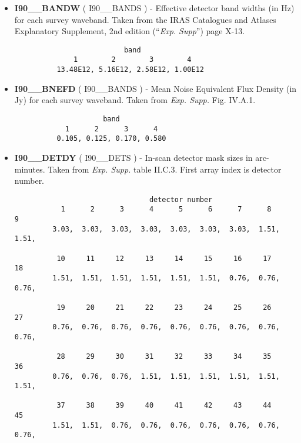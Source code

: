 \begin{itemize}
\item {\bf I90\_\_BANDW} ( I90\_\_BANDS ) -  Effective detector band widths (in Hz) for
each survey waveband. Taken from the IRAS Catalogues and Atlases Explanatory
Supplement, 2nd edition (``{\em Exp. Supp}'') page X-13.

\begin{minipage}[t]{\textwidth}
\small
\begin{verbatim}
                          band
              1        2        3        4
          13.48E12, 5.16E12, 2.58E12, 1.00E12
\end{verbatim}
\normalsize
\end{minipage}

\item {\bf I90\_\_BNEFD} ( I90\_\_BANDS ) -  Mean Noise Equivalent Flux Density (in Jy)
for each survey waveband. Taken from {\em Exp. Supp.} Fig. IV.A.1.

\begin{minipage}[t]{\textwidth}
\small
\begin{verbatim}
                     band
            1      2      3      4
          0.105, 0.125, 0.170, 0.580
\end{verbatim}
\normalsize
\end{minipage}

\item {\bf I90\_\_DETDY} ( I90\_\_DETS ) -   In-scan detector mask sizes in arc-minutes.
Taken from {\em Exp. Supp.} table II.C.3. First array index is detector number.

\begin{minipage}[t]{\textwidth}
\small
\begin{verbatim}
                                detector number
           1      2      3      4      5      6      7      8      9
         3.03,  3.03,  3.03,  3.03,  3.03,  3.03,  3.03,  1.51,  1.51,

          10     11     12     13     14     15     16     17     18
         1.51,  1.51,  1.51,  1.51,  1.51,  1.51,  0.76,  0.76,  0.76,

          19     20     21     22     23     24     25     26     27
         0.76,  0.76,  0.76,  0.76,  0.76,  0.76,  0.76,  0.76,  0.76,

          28     29     30     31     32     33     34     35     36
         0.76,  0.76,  0.76,  1.51,  1.51,  1.51,  1.51,  1.51,  1.51,

          37     38     39     40     41     42     43     44     45
         1.51,  1.51,  0.76,  0.76,  0.76,  0.76,  0.76,  0.76,  0.76,


\end{verbatim}
\end{minipage}
\end{itemize}
